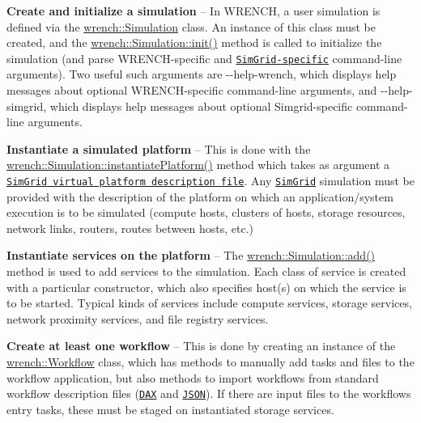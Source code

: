 \begin{DoxyEnumerate}
\item {\bfseries Create and initialize a simulation} -- In W\+R\+E\+N\+CH, a user simulation is defined via the {\ttfamily \hyperlink{classwrench_1_1_simulation}{wrench\+::\+Simulation}} class. An instance of this class must be created, and the {\ttfamily \hyperlink{classwrench_1_1_simulation_a3c6d35f1f77f35cbc727ce31e5689992}{wrench\+::\+Simulation\+::init()}} method is called to initialize the simulation (and parse W\+R\+E\+N\+C\+H-\/specific and \href{http://simgrid.gforge.inria.fr/simgrid/3.19/doc/options.html}{\tt Sim\+Grid-\/specific} command-\/line arguments). Two useful such arguments are {\ttfamily -\/-\/help-\/wrench}, which displays help messages about optional W\+R\+E\+N\+C\+H-\/specific command-\/line arguments, and {\ttfamily -\/-\/help-\/simgrid}, which displays help messages about optional Simgrid-\/specific command-\/line arguments.
\item {\bfseries Instantiate a simulated platform} -- This is done with the {\ttfamily \hyperlink{classwrench_1_1_simulation_ae22639abf6ede9f345b382f5ffe19b0e}{wrench\+::\+Simulation\+::instantiate\+Platform()}} method which takes as argument a \href{http://simgrid.gforge.inria.fr/simgrid/3.17/doc/platform.html}{\tt Sim\+Grid virtual platform description file}. Any \href{http://simgrid.gforge.inria.fr}{\tt Sim\+Grid} simulation must be provided with the description of the platform on which an application/system execution is to be simulated (compute hosts, clusters of hosts, storage resources, network links, routers, routes between hosts, etc.)
\item {\bfseries Instantiate services on the platform} -- The {\ttfamily \hyperlink{classwrench_1_1_simulation_ad1f5c12285ecfaf5a2ce7dab5ec8b4c5}{wrench\+::\+Simulation\+::add()}} method is used to add services to the simulation. Each class of service is created with a particular constructor, which also specifies host(s) on which the service is to be started. Typical kinds of services include compute services, storage services, network proximity services, and file registry services.
\item {\bfseries Create at least one workflow} -- This is done by creating an instance of the {\ttfamily \hyperlink{classwrench_1_1_workflow}{wrench\+::\+Workflow}} class, which has methods to manually add tasks and files to the workflow application, but also methods to import workflows from standard workflow description files (\href{http://workflowarchive.org}{\tt D\+AX} and \href{https://github.com/wrench-project/wrench/tree/master/doc/schemas}{\tt J\+S\+ON}). If there are input files to the workflow\textquotesingle{}s entry tasks, these must be staged on instantiated storage services.

\end{DoxyEnumerate}
